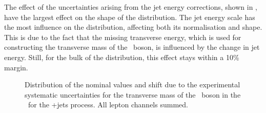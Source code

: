 The effect of the uncertainties arising from the jet energy corrections, shown in ,  have the largest effect on the shape of the distribution. The jet energy scale has the most influence on the distribution, affecting both its normalisation and shape. This is due to the fact that the missing transverse energy, which is used for constructing the transverse mass of the \PW\ boson, is influenced by the change in jet energy. Still, for the bulk of the distribution, this effect stays within a 10\% margin.
\begin{figure}[htbp] 
	\centering 
	\caption{Distribution of the nominal values and shift due to the experimental systematic uncertainties for the transverse mass of the \PW\ boson in the \WZCR\ for the \WZ+jets process. All lepton channels summed.}
	\label{fig:shiftMTW3}
\end{figure}

